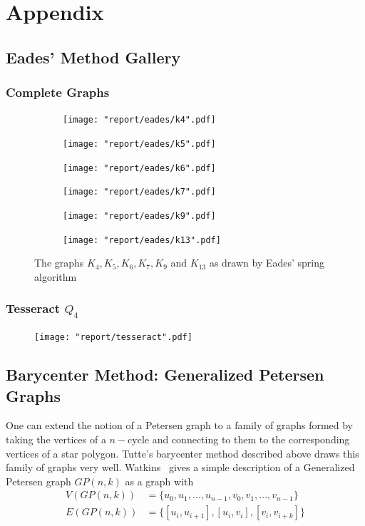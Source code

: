 \documentclass[11pt]{report}
\begin{document}
\chapter{Appendix}
\section{Eades' Method Gallery}
\subsection{Complete Graphs}
\begin{figure}[H]
    \centering
    
    \begin{subfigure}{.3\linewidth}
    \texttt{[image: "report/eades/k4".pdf]}
    \end{subfigure}
    \begin{subfigure}{.3\linewidth}
    \texttt{[image: "report/eades/k5".pdf]}
    \end{subfigure}
    \begin{subfigure}{.3\linewidth}
    \texttt{[image: "report/eades/k6".pdf]}
    \end{subfigure}

    \begin{subfigure}{.3\linewidth}
    \texttt{[image: "report/eades/k7".pdf]}
    \end{subfigure}
    \begin{subfigure}{.3\linewidth}
    \texttt{[image: "report/eades/k9".pdf]}
    \end{subfigure}
    \begin{subfigure}{.3\linewidth}
    \texttt{[image: "report/eades/k13".pdf]}
    \end{subfigure}

    \caption{The graphs $K_4, K_5, K_6, K_7, K_9$ and $K_{13}$ as drawn by Eades' spring algorithm}
\end{figure}

\subsection{Tesseract $Q_4$}
\begin{figure}[H]
    \centering
    \texttt{[image: "report/tesseract".pdf]}
\end{figure}

\section{Barycenter Method: Generalized Petersen Graphs}
One can extend the notion of a Petersen graph to a family of graphs formed by taking the vertices of a $n-$cycle and connecting to them to the corresponding vertices of a star polygon. Tutte's barycenter method described above draws this family of graphs very well. Watkins~\cite{watkins1969theorem} gives a simple description of a Generalized Petersen graph $GP(n, k)$ as a graph with
\[\begin{aligned}
V(GP(n, k)) &= \{ u_0, u_1, ..., u_{n - 1}, v_0, v_1, ..., v_{n - 1} \} \\
E(GP(n ,k)) &= \{ [u_i, u_{i+1}], [u_i, v_i], [v_i, v_{i+k}] \}
\end{aligned}\]
\end{document}
